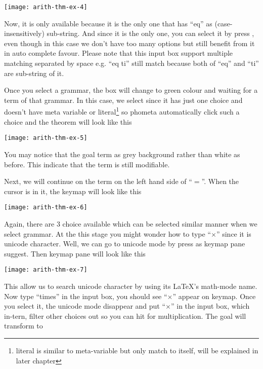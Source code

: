 \documentclass[master.tex]{subfiles}
\begin{document}
\begin{center}
\texttt{[image: arith-thm-ex-4]}
\end{center}

Now, it is only  available because it is the only one that has
``eq'' as (case-insensitively) sub-string. And since it is the only one, you can
select it by press , even though in this case we don't have too
many options but still benefit from it in auto complete favour. Please note that
this input box support multiple matching separated by space e.g. ``eq ti'' still
match  because both of ``eq'' and ``ti'' are sub-string of it.

Once you select a grammar, the box will change to green colour and waiting for a
term of that grammar. In this case, we select  since it has just
one choice and doesn't have meta variable or literal\footnote{literal is similar
  to meta-variable but only match to itself, will be explained in later
  chapter} so phometa automatically click such a choice and the theorem will
look like this

\begin{center}
\texttt{[image: arith-thm-ex-5]}
\end{center}

You may notice that the goal term as grey background rather than white as
before. This indicate that the term is still modifiable.

Next, we will continue on the  term on the left hand side of
``$=$''. When the cursor is in it, the keymap will look like this

\begin{center}
\texttt{[image: arith-thm-ex-6]}
\end{center}

Again, there are 3 choice available which can be selected similar manner when we
select grammar. At the this stage you might wonder how to type ``$\times$''
since it is unicode character. Well, we can go to unicode mode by press
 as keymap pane suggest. Then keymap pane will look like this

\begin{center}
\texttt{[image: arith-thm-ex-7]}
\end{center}

This allow us to search unicode character by using its \LaTeX{}'s math-mode
name. Now type ``times'' in the input box, you should see ``$\times$'' appear on
keymap. Once you select it, the unicode mode disappear and put ``$\times$'' in
the input box, which in-tern, filter other choices out so you can hit
 for multiplication. The goal will transform to
\end{document}

